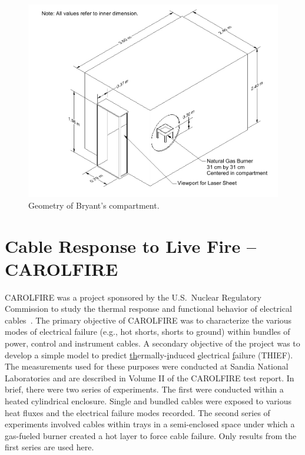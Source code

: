 \begin{figure}[ht]
\includegraphics[width=\textwidth]{FIGURES/Bryant_Doorway/Bryant_Compartment}
\caption[Geometry of Bryant's compartment]{Geometry of Bryant's compartment.}
\label{Bryant_Drawing}
\end{figure}


\section{Cable Response to Live Fire -- CAROLFIRE}
\label{CAROLFIRE_Description}

CAROLFIRE was a project sponsored by the U.S.~Nuclear Regulatory Commission to study the thermal response and functional behavior of electrical cables~\cite{CAROLFIRE}. The primary objective of CAROLFIRE was to characterize the various modes of electrical failure (e.g., hot shorts, shorts to ground) within bundles of power, control and instrument cables. A secondary objective of the project was to develop a simple model to predict \underline{th}ermally-\underline{i}nduced \underline{e}lectrical \underline{f}ailure (THIEF). The measurements used for these purposes were conducted at Sandia National Laboratories and are described in Volume II of the CAROLFIRE test report. In brief, there were two series of experiments. The first were conducted within a heated cylindrical enclosure. Single and bundled cables were exposed to various heat fluxes and the electrical failure modes recorded. The second series of experiments involved cables within trays in a semi-enclosed space under which a gas-fueled burner created a hot layer to force cable failure. Only results from the first series are used here.

